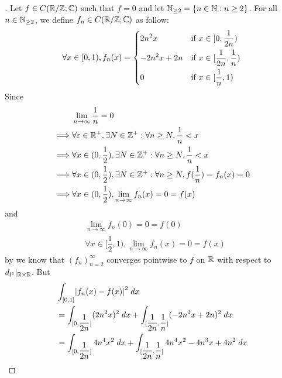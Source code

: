 \begin{proof}[]
  Let \(f \in C(\mathbb{R} / \mathbb{Z} ; \mathbb{C})\) such that \(f = 0\) and let \(\mathbb{N}_{\geq 2} = \left\lbrace n \in \mathbb{N} : n \geq 2\right\rbrace\).
  For all \(n \in \mathbb{N}_{\geq 2}\), we define \(f_n \in C(\mathbb{R} / \mathbb{Z} ; \mathbb{C})\) as follow:
  \[
    \forall x \in [0, 1), f_n(x) = \begin{dcases}
      2 n^2 x       & \text{if } x \in [0, \dfrac{1}{2n})            \\
      -2 n^2 x + 2n & \text{if } x \in [\dfrac{1}{2n}, \dfrac{1}{n}) \\
      0             & \text{if } x \in [\dfrac{1}{n}, 1)
    \end{dcases}
  \]
  Since
  \begin{align*}
             & \lim_{n \to \infty} \dfrac{1}{n} = 0                                                                 \\
    \implies & \forall \varepsilon \in \mathbb{R}^+, \exists N \in \mathbb{Z}^+ : \forall n \geq N, \dfrac{1}{n} < x                \\
    \implies & \forall x \in (0, \dfrac{1}{2}), \exists N \in \mathbb{Z}^+ : \forall n \geq N, \dfrac{1}{n} < x             \\
    \implies & \forall x \in (0, \dfrac{1}{2}), \exists N \in \mathbb{Z}^+ : \forall n \geq N, f(\dfrac{1}{n}) = f_n(x) = 0 \\
    \implies & \forall x \in (0, \dfrac{1}{2}), \lim_{n \to \infty} f_n(x) = 0 = f(x)
  \end{align*}
  and
  \begin{align*}
     & \lim_{n \to \infty} f_n(0) = 0 = f(0)                                  \\
     & \forall x \in [\dfrac{1}{2}, 1), \lim_{n \to \infty} f_n(x) = 0 = f(x)
  \end{align*}
  by  we know that \((f_n)_{n = 2}^\infty\) converges pointwise to \(f\) on \(\mathbb{R}\) with respect to \(d_{l^1}|_{\mathbb{R} \times \mathbb{R}}\).
  But
  \begin{align*}
     & \int_{[0, 1]} \abs{f_n(x) - f(x)}^2 \; dx                                                                                                                    \\
     & = \int_{[0, \dfrac{1}{2n}]} (2 n^2 x)^2 \; dx + \int_{[\dfrac{1}{2n}, \dfrac{1}{n}]} (-2n^2 x + 2n)^2 \; dx                                                  \\
     & = \int_{[0, \dfrac{1}{2n}]} 4 n^4 x^2 \; dx + \int_{[\dfrac{1}{2n}, \dfrac{1}{n}]} 4 n^4 x^2 - 4 n^3 x + 4n^2 \; dx                                          \\

\end{align*}
\end{proof}
